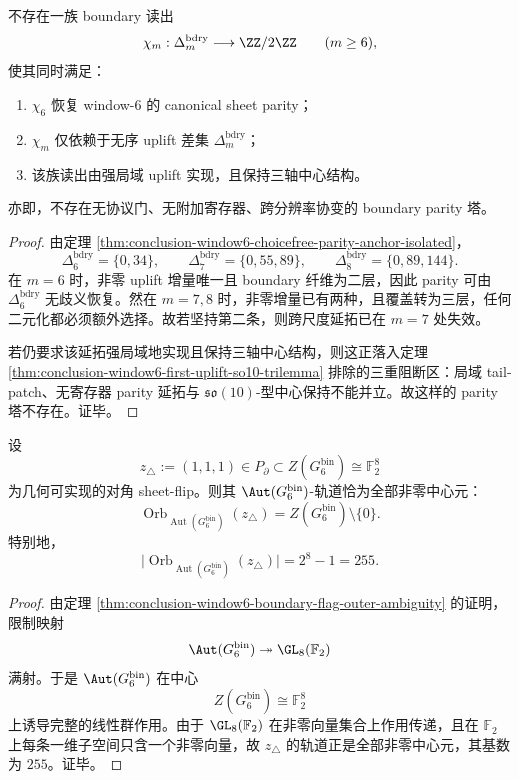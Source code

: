\begin{theorem}\label{thm:conclusion-window6-no-gateless-crossscale-parity-tower}
不存在一族 boundary 读出
\[
\chi_m:\Delta_m^{\mathrm{bdry}}\longrightarrow \ZZ/2\ZZ
\qquad (m\ge 6),
\]
使其同时满足：
\begin{enumerate}
  \item \(\chi_6\) 恢复 window-\(6\) 的 canonical sheet parity；
  \item \(\chi_m\) 仅依赖于无序 uplift 差集 \(\Delta_m^{\mathrm{bdry}}\)；
  \item 该族读出由强局域 uplift 实现，且保持三轴中心结构。
\end{enumerate}
亦即，不存在无协议门、无附加寄存器、跨分辨率协变的 boundary parity 塔。
\end{theorem}
\begin{proof}
由定理 \ref{thm:conclusion-window6-choicefree-parity-anchor-isolated}，
\[
\Delta_6^{\mathrm{bdry}}=\{0,34\},\qquad
\Delta_7^{\mathrm{bdry}}=\{0,55,89\},\qquad
\Delta_8^{\mathrm{bdry}}=\{0,89,144\}.
\]
在 \(m=6\) 时，非零 uplift 增量唯一且 boundary 纤维为二层，因此 parity 可由 \(\Delta_6^{\mathrm{bdry}}\) 无歧义恢复。然在 \(m=7,8\) 时，非零增量已有两种，且覆盖转为三层，任何二元化都必须额外选择。故若坚持第二条，则跨尺度延拓已在 \(m=7\) 处失效。

若仍要求该延拓强局域地实现且保持三轴中心结构，则这正落入定理 \ref{thm:conclusion-window6-first-uplift-so10-trilemma} 排除的三重阻断区：局域 tail-patch、无寄存器 parity 延拓与 \(\mathfrak{so}(10)\)-型中心保持不能并立。故这样的 parity 塔不存在。证毕。
\end{proof}

\begin{theorem}[几何对角翻转的抽象轨道塌缩]\label{thm:conclusion-window6-geometric-diagonal-aut-orbit-collapse}
设
\[
z_{\triangle}:=(1,1,1)\in P_{\partial}\subset Z(G_6^{\mathrm{bin}})\cong \mathbb F_2^8
\]
为几何可实现的对角 sheet-flip。则其 \(\Aut(G_6^{\mathrm{bin}})\)-轨道恰为全部非零中心元：
\[
\operatorname{Orb}_{\operatorname{Aut}(G_6^{\mathrm{bin}})}(z_{\triangle})
=
Z(G_6^{\mathrm{bin}})\setminus\{0\}.
\]
特别地，
\[
\bigl|\operatorname{Orb}_{\operatorname{Aut}(G_6^{\mathrm{bin}})}(z_{\triangle})\bigr|=2^8-1=255.
\]
\end{theorem}
\begin{proof}
由定理 \ref{thm:conclusion-window6-boundary-flag-outer-ambiguity} 的证明，限制映射
\[
\Aut(G_6^{\mathrm{bin}})\twoheadrightarrow \GL_8(\mathbb F_2)
\]
满射。于是 \(\Aut(G_6^{\mathrm{bin}})\) 在中心
\[
Z(G_6^{\mathrm{bin}})\cong \mathbb F_2^8
\]
上诱导完整的线性群作用。由于 \(\GL_8(\mathbb F_2)\) 在非零向量集合上作用传递，且在 \(\mathbb F_2\) 上每条一维子空间只含一个非零向量，故 \(z_{\triangle}\) 的轨道正是全部非零中心元，其基数为 \(255\)。证毕。
\end{proof}

